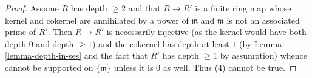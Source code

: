 \begin{proof}
\medskip\noindent
Assume $R$ has depth $\geq 2$ and that $R \to R'$ is a finite
ring map whose kernel and cokernel are annihilated by a power
of $\mathfrak m$ and $\mathfrak m$ is not an associated prime of $R'$.
Then $R \to R'$ is necessarily injective (as the kernel would have
both depth $0$ and depth $\geq 1$) and the cokernel has depth
at least $1$ (by Lemma \ref{lemma-depth-in-ses}
and the fact that $R'$ has depth $\geq 1$ by assumption)
whence cannot be supported on
$\{\mathfrak m\}$ unless it is $0$ as well. Thus (4) cannot be true.
\end{proof}